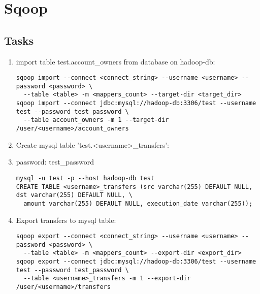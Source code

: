 \documentclass{article}
\begin{document}
\section*{Sqoop}

\subsection*{Tasks}

\begin{enumerate}
\item import table test.account\_owners from database on hadoop-db:
\begin{lstlisting}
sqoop import --connect <connect_string> --username <username> --password <password> \
  --table <table> -m <mappers_count> --target-dir <target_dir>
sqoop import --connect jdbc:mysql://hadoop-db:3306/test --username test --password test_password \
  --table account_owners -m 1 --target-dir /user/<username>/account_owners
\end{lstlisting}
\item Create mysql table 'test.<username>\_transfers':
\item password: test\_password
\begin{lstlisting}
mysql -u test -p --host hadoop-db test
CREATE TABLE <username>_transfers (src varchar(255) DEFAULT NULL, dst varchar(255) DEFAULT NULL, \
  amount varchar(255) DEFAULT NULL, execution_date varchar(255));
\end{lstlisting}
\item Export transfers to mysql table:
\begin{lstlisting}
sqoop export --connect <connect_string> --username <username> --password <password> \
  --table <table> -m <mappers_count> --export-dir <export_dir>
sqoop export --connect jdbc:mysql://hadoop-db:3306/test --username test --password test_password \
  --table <username>_transfers -m 1 --export-dir /user/<username>/transfers
\end{lstlisting}
\end{enumerate}
\end{document}
